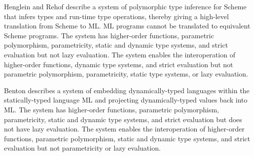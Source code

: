 Henglein and Rehof \cite{henglein95} describe a system of polymorphic type inference for Scheme that infers types and run-time type operations, thereby giving a high-level translation from Scheme to ML.  ML programs cannot be translated to equivalent Scheme programs.  The system has higher-order functions, parametric polymorphism, parametricity, static and dynamic type systems, and strict evaluation but not lazy evaluation.  The system enables the interoperation of higher-order functions, dynamic type systems, and strict evaluation but not parametric polymorphism, parametricity, static type systems, or lazy evaluation.

Benton \cite{benton05} describes a system of embedding dynamically-typed languages within the statically-typed language ML and projecting dynamically-typed values back into ML.  The system has higher-order functions, parametric polymorphism, parametricity, static and dynamic type systems, and strict evaluation but does not have lazy evaluation.  The system enables the interoperation of higher-order functions, parametric polymorphism, static and dynamic type systems, and strict evaluation but not parametricity or lazy evaluation.